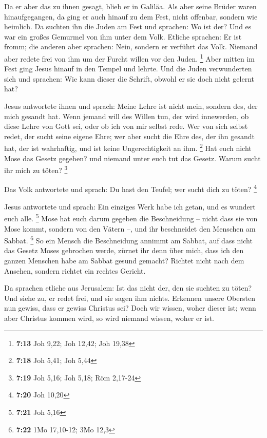  Da er aber das zu ihnen gesagt, blieb er in Galiläa.
 Als aber seine Brüder waren hinaufgegangen, da ging er
auch hinauf zu dem Fest, nicht offenbar, sondern wie heimlich.
 Da suchten ihn die Juden am Fest und sprachen: Wo ist der?
 Und es war ein großes Gemurmel von ihm unter dem Volk.
Etliche sprachen: Er ist fromm; die anderen aber sprachen: Nein, sondern
er verführt das Volk.  Niemand aber redete frei von ihm um
der Furcht willen vor den Juden. \footnote{\textbf{7:13} Joh 9,22; Joh
  12,42; Joh 19,38}  Aber mitten im Fest ging Jesus hinauf
in den Tempel und lehrte.  Und die Juden verwunderten sich
und sprachen: Wie kann dieser die Schrift, obwohl er sie doch nicht
gelernt hat?

 Jesus antwortete ihnen und sprach: Meine Lehre ist nicht
mein, sondern des, der mich gesandt hat.  Wenn jemand will
des Willen tun, der wird innewerden, ob diese Lehre von Gott sei, oder
ob ich von mir selbst rede.  Wer von sich selbst redet, der
sucht seine eigene Ehre; wer aber sucht die Ehre des, der ihn gesandt
hat, der ist wahrhaftig, und ist keine Ungerechtigkeit an ihm.
\footnote{\textbf{7:18} Joh 5,41; Joh 5,44}  Hat euch nicht
Mose das Gesetz gegeben? und niemand unter euch tut das Gesetz. Warum
sucht ihr mich zu töten? \footnote{\textbf{7:19} Joh 5,16; Joh 5,18; Röm
  2,17-24}

 Das Volk antwortete und sprach: Du hast den Teufel; wer
sucht dich zu töten? \footnote{\textbf{7:20} Joh 10,20}

 Jesus antwortete und sprach: Ein einziges Werk habe ich
getan, und es wundert euch alle. \footnote{\textbf{7:21} Joh 5,16}
 Mose hat euch darum gegeben die Beschneidung -- nicht dass
sie von Mose kommt, sondern von den Vätern --, und ihr beschneidet den
Menschen am Sabbat. \footnote{\textbf{7:22} 1Mo 17,10-12; 3Mo 12,3}
 So ein Mensch die Beschneidung annimmt am Sabbat, auf dass
nicht das Gesetz Moses gebrochen werde, zürnet ihr denn über mich, dass
ich den ganzen Menschen habe am Sabbat gesund gemacht? 
Richtet nicht nach dem Ansehen, sondern richtet ein rechtes Gericht.

 Da sprachen etliche aus Jerusalem: Ist das nicht der, den
sie suchten zu töten?  Und siehe zu, er redet frei, und sie
sagen ihm nichts. Erkennen unsere Obersten nun gewiss, dass er gewiss
Christus sei?  Doch wir wissen, woher dieser ist; wenn aber
Christus kommen wird, so wird niemand wissen, woher er ist.

